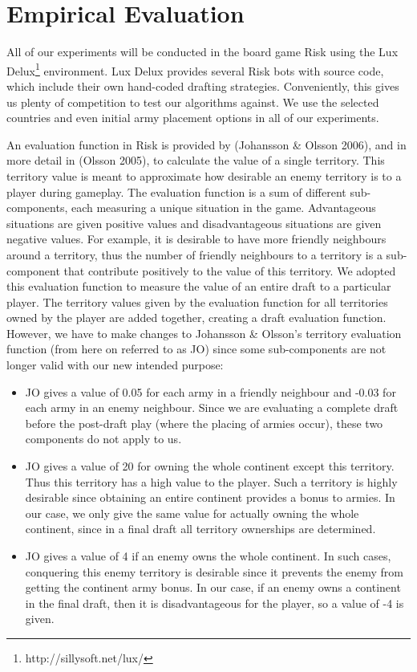 \documentclass[letterpaper]{article}
\numberwithin{equation}{section}
\numberwithin{theorem}{section}
\numberwithin{lemma}{section}
\numberwithin{df}{section}
\begin{document}
\section{Empirical Evaluation}

All of our experiments will be conducted in the board game Risk using the Lux Delux\footnote{http://sillysoft.net/lux/} environment.  Lux Delux provides several Risk bots with source code, which include their own hand-coded drafting strategies.  Conveniently, this gives us plenty of competition to test our algorithms against.  We use the selected countries and even initial army placement options in all of our experiments.

An evaluation function in Risk is provided by (Johansson \& Olsson 2006), and in more detail in (Olsson 2005), to calculate the value of a single territory.  This territory value is meant to approximate how desirable an enemy territory is to a player during gameplay.  The evaluation function is a sum of different sub-components, each measuring a unique situation in the game.  Advantageous situations are given positive values and disadvantageous situations are given negative values.  For example, it is desirable to have more friendly neighbours around a territory, thus the number of friendly neighbours to a territory is a sub-component that contribute positively to the value of this territory.
We adopted this evaluation function to measure the value of an entire draft to a particular player.  The territory values given by the evaluation function for all territories owned by the player are added together, creating a draft evaluation function.  However, we have to make changes to Johansson \& Olsson's territory evaluation function (from here on referred to as JO) since some sub-components are not longer valid with our new intended purpose:
\begin{itemize}
  \item JO gives a value of 0.05 for each army in a friendly neighbour and -0.03 for each army in an enemy neighbour.  Since we are evaluating a complete draft before the post-draft play (where the placing of armies occur), these two components do not apply to us.
  \item JO gives a value of 20 for owning the whole continent except this territory.  Thus this territory has a high value to the player.  Such a territory is highly desirable since obtaining an entire continent provides a bonus to armies.  In our case, we only give the same value for actually owning the whole continent, since in a final draft all territory ownerships are determined.
  \item JO gives a value of 4 if an enemy owns the whole continent. In such cases, conquering this enemy territory is desirable since it prevents the enemy from getting the continent army bonus.  In our case, if an enemy owns a continent in the final draft, then it is disadvantageous for the player, so a value of -4 is given.
\end{itemize}	
	
\end{document}
